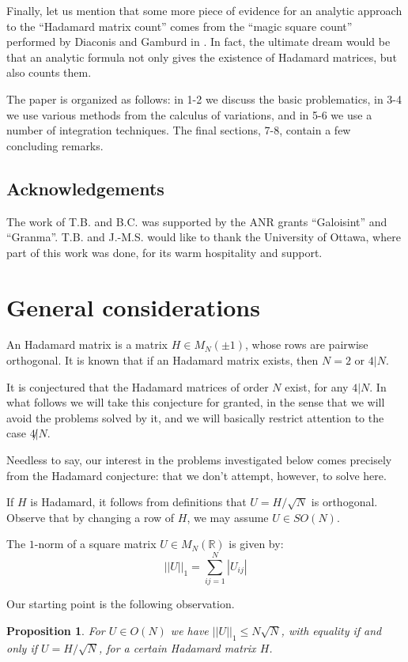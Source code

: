 \documentclass[12pt]{amsart}
\newtheorem{proposition}[theorem]{Proposition}
\begin{document}
Finally, let us mention that some more piece of evidence for an analytic approach to the ``Hadamard matrix count'' comes from the ``magic square count'' performed by Diaconis and Gamburd in \cite{dga}. In fact, the ultimate dream would be that an analytic formula not only gives the existence of Hadamard matrices, but also counts them.

The paper is organized as follows: in 1-2 we discuss the basic problematics, in 3-4 we use various methods from the calculus of variations, and in 5-6 we use a number of integration techniques. The final sections, 7-8, contain a few concluding remarks.

\subsection*{Acknowledgements}

The work of T.B. and B.C. was supported by the ANR grants ``Galoisint'' and ``Granma''. T.B. and J.-M.S. would like to thank the University of Ottawa, where part of this work was done, for its warm hospitality and support.

\section{General considerations}

An Hadamard matrix is a matrix $H\in M_N(\pm 1)$, whose rows are pairwise orthogonal. It is known that if an Hadamard matrix exists, then $N=2$ or $4|N$.

It is conjectured that the Hadamard matrices of order $N$ exist, for any $4|N$. In what follows we will take this conjecture for granted, in the sense that we will avoid the problems solved by it, and we will basically restrict attention to the case $4\!\!\not|N$. 

Needless to say, our interest in the problems investigated below comes precisely from the Hadamard conjecture: that we don't attempt, however, to solve here.

If $H$ is Hadamard, it follows from definitions that $U=H/\sqrt{N}$ is orthogonal. Observe that by changing a row of $H$, we may assume $U\in SO(N)$.

The $1$-norm of a square matrix $U\in M_N(\mathbb R)$ is given by:
$$||U||_1=\sum_{ij=1}^N|U_{ij}|$$

Our starting point is the following observation.

\begin{proposition}
For $U\in O(N)$ we have $||U||_1\leq N\sqrt{N}$, with equality if and only if $U=H/\sqrt{N}$, for a certain Hadamard matrix $H$.
\end{proposition}
\end{document}
